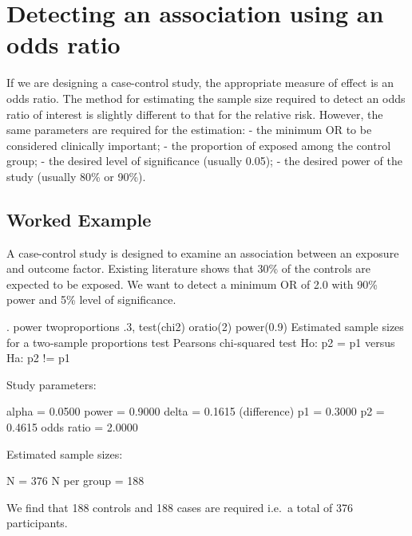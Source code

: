 \documentclass[
]{memoir}
\newenvironment{Shaded}{\begin{snugshade}}{\end{snugshade}}
\newcommand{\NormalTok}[1]{#1}
\begin{document}
\hypertarget{detecting-an-association-using-an-odds-ratio}{%
\section{Detecting an association using an odds ratio}\label{detecting-an-association-using-an-odds-ratio}}

If we are designing a case-control study, the appropriate measure of effect is an odds ratio. The method for estimating the sample size required to detect an odds ratio of interest is slightly different to that for the relative risk. However, the same parameters are required for the estimation:
- the minimum OR to be considered clinically important;
- the proportion of exposed among the control group;
- the desired level of significance (usually 0.05);
- the desired power of the study (usually 80\% or 90\%).

\hypertarget{worked-example-18}{%
\subsection{Worked Example}\label{worked-example-18}}

A case-control study is designed to examine an association between an exposure and outcome factor. Existing literature shows that 30\% of the controls are expected to be exposed. We want to detect a minimum OR of 2.0 with 90\% power and 5\% level of significance.

\begin{Shaded}
\begin{Highlighting}[]
\NormalTok{. power twoproportions .3, test(chi2) oratio(2) power(0.9)}
\NormalTok{Estimated sample sizes for a two{-}sample proportions test}
\NormalTok{Pearson\textquotesingle{}s chi{-}squared test }
\NormalTok{Ho: p2 = p1  versus  Ha: p2 != p1}

\NormalTok{Study parameters:}

\NormalTok{        alpha =    0.0500}
\NormalTok{        power =    0.9000}
\NormalTok{        delta =    0.1615  (difference)}
\NormalTok{           p1 =    0.3000}
\NormalTok{           p2 =    0.4615}
\NormalTok{   odds ratio =    2.0000}

\NormalTok{Estimated sample sizes:}

\NormalTok{            N =       376}
\NormalTok{  N per group =       188}
\end{Highlighting}
\end{Shaded}

We find that 188 controls and 188 cases are required i.e.~a total of 376 participants.
\end{document}
